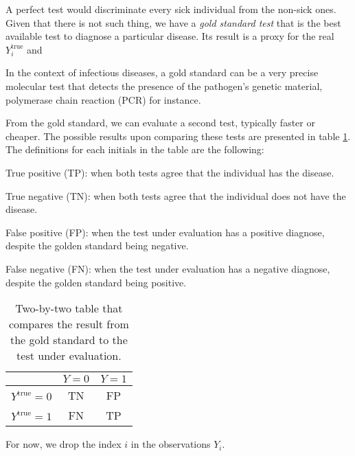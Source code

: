 A perfect test would discriminate every sick individual from the non-sick ones.
Given that there is not such thing, we have a {\em gold standard
test} that is the best available test \cite{versi1992gold} to diagnose a
particular disease. Its result is a proxy for the real $Y^{\mathrm{true}}_i$ and 

\begin{citacao}
  In the context of infectious diseases, a gold standard can be a very precise
  molecular test that detects the presence of the pathogen’s genetic material,
  polymerase chain reaction (PCR) for instance. \cite{bastos2021modelling}
\end{citacao}

From the gold standard, we can evaluate a second test, typically faster or
cheaper. The possible results upon comparing these tests are presented in
table \ref{table:two-by-two}. The definitions for each initials in the table
are the following: 

\begin{alineas}
  \item True positive (TP): when both tests agree that the individual has the
  disease. 
  \item True negative (TN): when both tests agree that the individual does not
  have the disease.
  \item False positive (FP): when the test under evaluation has a positive
  diagnose, despite the golden standard being negative. 
  \item False negative (FN): when the test under evaluation has a negative
  diagnose, despite the golden standard being positive.
\end{alineas}

\begin{table}[!ht]
  \centering
  \begin{tabular}{c|c|c|}
  \cline{2-3}
                                               & $Y = 0$ & $Y = 1$ \\ \hline
  \multicolumn{1}{|c|}{$Y^{\mathrm{true}}= 0$} & TN    & FP    \\ \hline
  \multicolumn{1}{|c|}{$Y^{\mathrm{true}}= 1$} & FN    & TP    \\ \hline
  \end{tabular}
  \caption{Two-by-two table that compares the result from the gold standard to
  the test under evaluation.}
  \label{table:two-by-two}
\end{table}

For now, we drop the index $i$ in the observations $Y_i$. 

